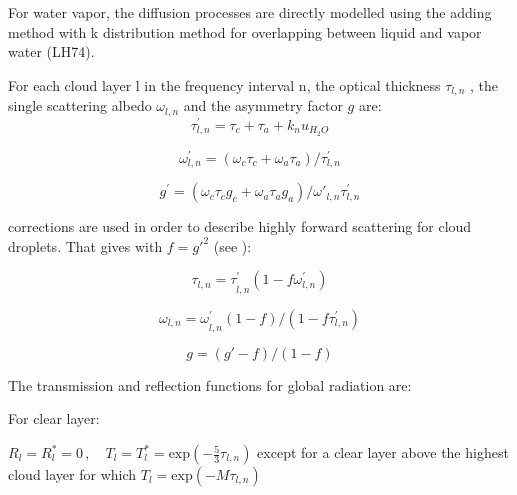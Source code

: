 For water vapor, the diffusion processes are directly modelled using the
adding method with k distribution method for overlapping between liquid and
vapor water (LH74).

For each cloud layer l in the frequency interval n, the optical thickness $\tau
_{l,n}$ , the single scattering albedo $\omega_{l,n}$ and the asymmetry
factor $g$ are:
\begin{equation}
\tau_{l,n}^{'}=\tau_{c}+\tau_{a}+k_{n}u_{H_{2}O}
\end{equation}

\begin{equation}
\omega_{l,n}^{'}=(\omega_{c}\tau_{c}+\omega_{a}\tau_{a})/\tau
_{l,n}^{'}
\end{equation}

\begin{equation}
g^{'}=(\omega_{c}\tau_{c}g_{c}+\omega_{a}\tau_{a}g_{a})/{\omega
'}_{l,n}\tau_{l,n}^{'}
\end{equation}

\cite{Joseph:1976} corrections are used in order to describe highly forward
scattering for cloud droplets. That gives with $f=g'^{2}$ (see \cite{Stephens:1984}):

\begin{equation}
{\tau_{l,n}=\tau }_{l,n}^{'}(1-f\omega_{l,n}^{'})
\end{equation}

\begin{equation}
{\omega_{l,n}=\omega }_{l,n}^{'}(1-f)/(1-f\tau_{l,n}^{'})
\end{equation}

\begin{equation}
g=(g'-f)/(1-f)
\end{equation}

The transmission and reflection functions for global radiation are:

For clear layer:

$R_{l}=R_{l}^{\ast }=0\, ,
\quad
T_{l}=T_{l}^{\ast }=\mathrm{exp}(-\frac{5}{3}\tau_{l,n})$ except for a
clear layer above the highest cloud layer for which
$T_{l}=\mathrm{exp}(-M\tau_{l,n})$

